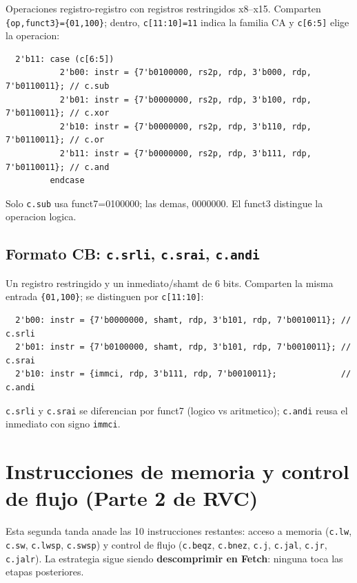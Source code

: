 \documentclass[11pt,a4paper]{article}
\begin{document}
Operaciones registro-registro con registros restringidos x8--x15. Comparten
\texttt{\{op,funct3\}=\{01,100\}}; dentro, \texttt{c[11:10]=11} indica la familia
CA y \texttt{c[6:5]} elige la operacion:

\begin{lstlisting}
  2'b11: case (c[6:5])
           2'b00: instr = {7'b0100000, rs2p, rdp, 3'b000, rdp, 7'b0110011}; // c.sub
           2'b01: instr = {7'b0000000, rs2p, rdp, 3'b100, rdp, 7'b0110011}; // c.xor
           2'b10: instr = {7'b0000000, rs2p, rdp, 3'b110, rdp, 7'b0110011}; // c.or
           2'b11: instr = {7'b0000000, rs2p, rdp, 3'b111, rdp, 7'b0110011}; // c.and
         endcase
\end{lstlisting}

Solo \texttt{c.sub} usa funct7=0100000; las demas, 0000000. El funct3 distingue la
operacion logica.

\subsection{Formato CB: \texttt{c.srli}, \texttt{c.srai}, \texttt{c.andi}}

Un registro restringido y un inmediato/shamt de 6 bits. Comparten la misma entrada
\texttt{\{01,100\}}; se distinguen por \texttt{c[11:10]}:

\begin{lstlisting}
  2'b00: instr = {7'b0000000, shamt, rdp, 3'b101, rdp, 7'b0010011}; // c.srli
  2'b01: instr = {7'b0100000, shamt, rdp, 3'b101, rdp, 7'b0010011}; // c.srai
  2'b10: instr = {immci, rdp, 3'b111, rdp, 7'b0010011};             // c.andi
\end{lstlisting}

\texttt{c.srli} y \texttt{c.srai} se diferencian por funct7 (logico vs
aritmetico); \texttt{c.andi} reusa el inmediato con signo \texttt{immci}.

\section{Instrucciones de memoria y control de flujo (Parte 2 de RVC)}

Esta segunda tanda anade las 10 instrucciones restantes: acceso a memoria
(\texttt{c.lw}, \texttt{c.sw}, \texttt{c.lwsp}, \texttt{c.swsp}) y control de
flujo (\texttt{c.beqz}, \texttt{c.bnez}, \texttt{c.j}, \texttt{c.jal},
\texttt{c.jr}, \texttt{c.jalr}). La estrategia sigue siendo
\textbf{descomprimir en Fetch}: ninguna toca las etapas posteriores.
\end{document}
